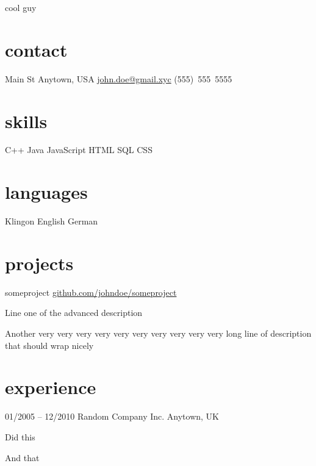\documentclass[]{friggeri-minimal-cv}
\begin{document}
       {cool guy}

\begin{aside}
  \section{contact}
     Main St
    Anytown, USA
    \sideblockspace%
    \href{mailto:john.doe@gmail.xyc}{john.doe@gmail.xyc}
    (555)~555~5555
    \sideblockspace%
  \section{skills}
    \quad C++
    \quad Java
    \quad JavaScript
    \quad HTML
    \quad SQL
    \quad CSS
  \section{languages}
    \quad Klingon 
    \quad English
    \quad German
\end{aside}

\section{projects}

\begin{undatedentrylist}
  \undatedentry
    {someproject }
    {\href{https://github.com/johndoe/someproject}{github.com/johndoe/someproject}}
    {\begin{entryitemize}
       \item Line one of the advanced description
       \item Another very very very very very very very very very very long line of description that should wrap nicely
     \end{entryitemize}}
\end{undatedentrylist}

\section{experience}

\begin{entrylist}
  \monthentry
    {01/2005 -- 12/2010}
    {Random Company Inc. }
    {Anytown, UK}
    {\begin{entryitemize}
       \item Did this
       \item And that
     \end{entryitemize}}
\end{entrylist}
\end{document}
